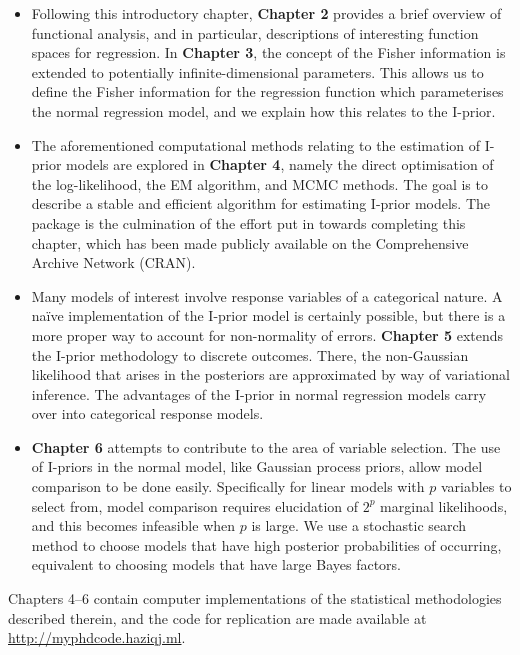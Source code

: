\documentclass[a4paper,showframe,11pt]{report}
\begin{document}
\begin{itemize}
  \item Following this introductory chapter, \textbf{Chapter 2} provides a brief overview of functional analysis, and in particular, descriptions of interesting function spaces for regression.
  In \textbf{Chapter 3}, the concept of the Fisher information is extended to potentially infinite-dimensional parameters.
  This allows us to define the Fisher information for the regression function which parameterises the normal regression model, and we explain how this relates to the I-prior.
  
  \item The aforementioned computational methods relating to the estimation of I-prior models are explored in \textbf{Chapter 4}, namely the direct optimisation of the log-likelihood, the EM algorithm, and MCMC methods.
  The goal is to describe a stable and efficient algorithm for estimating I-prior models.
  The  package  is the culmination of the effort put in towards completing this chapter, which has been made publicly available on the Comprehensive  Archive Network (CRAN).

  \item Many models of interest involve response variables of a categorical nature.
  A naïve implementation of the I-prior model is certainly possible, but there is  a more proper way to account for non-normality of errors.
  \textbf{Chapter 5} extends the I-prior methodology to discrete outcomes.
  There, the non-Gaussian likelihood that arises in the posteriors are approximated by way of variational inference.
  The advantages of the I-prior in normal regression models carry over into categorical response models.

  \item \textbf{Chapter 6} attempts to contribute to the area of variable selection.
  The use of I-priors in the normal model, like Gaussian process priors, allow model comparison to be done easily.
  Specifically for linear models with $p$ variables to select from, model comparison requires elucidation of $2^p$ marginal likelihoods, and this becomes infeasible when $p$ is large.
  We use a stochastic search method to choose models that have high posterior probabilities of occurring, equivalent to choosing models that have large Bayes factors.
\end{itemize}

Chapters 4--6 contain computer implementations of the statistical methodologies described therein, and the code for replication are made available at \url{http://myphdcode.haziqj.ml}.

\hClosingStuffStandalone
\end{document}
